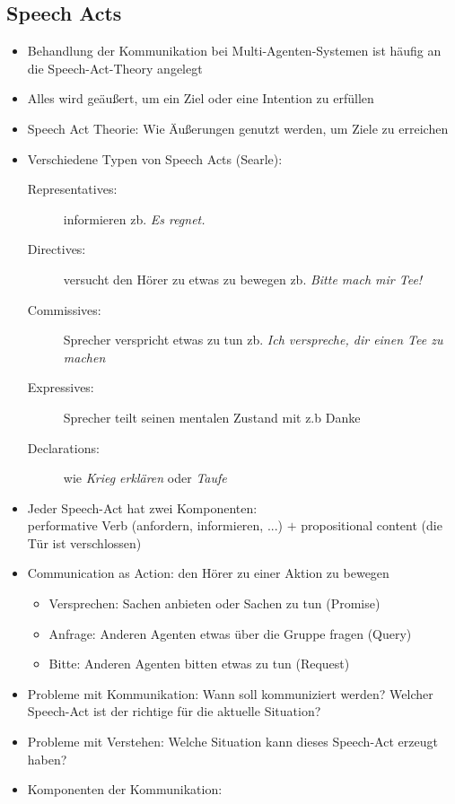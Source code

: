 \documentclass{article} %
\begin{document}
	\subsection{Speech Acts}
	\begin{itemize}
		\item Behandlung der Kommunikation bei Multi-Agenten-Systemen ist häufig an die Speech-Act-Theory angelegt
		\item Alles wird geäußert, um ein Ziel oder eine Intention zu erfüllen
		\item Speech Act Theorie: Wie Äußerungen genutzt werden, um Ziele zu erreichen
		\item Verschiedene Typen von Speech Acts (Searle):
		\begin{description}
			\item [Representatives:] informieren zb. \emph{Es regnet.}
			\item [Directives:] versucht den Hörer zu etwas zu bewegen zb. \emph{Bitte mach mir Tee!}
			\item [Commissives:] Sprecher verspricht etwas zu tun zb. \emph{Ich verspreche, dir einen Tee zu machen}
			\item [Expressives:] Sprecher teilt seinen mentalen Zustand mit z.b Danke
			\item [Declarations:] wie \emph{Krieg erklären} oder \emph{Taufe}
		\end{description}
		\item Jeder Speech-Act hat zwei Komponenten: \\
		performative Verb (anfordern, informieren, ...) $+$ propositional content (die Tür ist verschlossen)
		\item Communication as Action: den Hörer zu einer Aktion zu bewegen
		\begin{itemize}
			\item Versprechen: Sachen anbieten oder Sachen zu tun (Promise)
			\item Anfrage: Anderen Agenten etwas über die Gruppe fragen (Query)
			\item Bitte: Anderen Agenten bitten etwas zu tun (Request)
		\end{itemize}
		\item Probleme mit Kommunikation: Wann soll kommuniziert werden? Welcher Speech-Act ist der richtige für die aktuelle Situation? 
		\item Probleme mit Verstehen: Welche Situation kann dieses Speech-Act erzeugt haben?
		\item Komponenten der Kommunikation:

\end{itemize}
\end{document}

